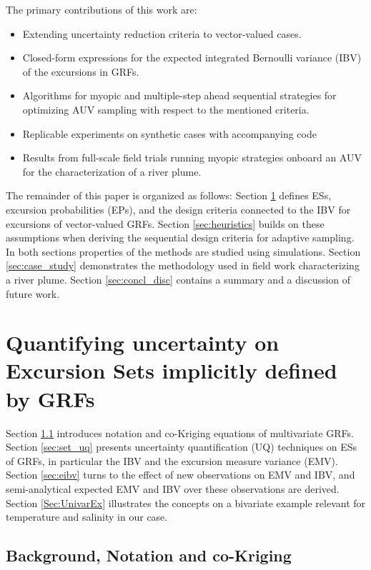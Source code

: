 \documentclass[aoas,preprint]{imsart}
\begin{document}
The primary contributions of this work are:

\begin{itemize}
\item Extending uncertainty reduction criteria to
  vector-valued cases.  
\item Closed-form expressions for the expected integrated Bernoulli
  variance (IBV) of the excursions in GRFs. 
\item Algorithms for myopic and multiple-step ahead sequential
  strategies for optimizing AUV sampling with respect to the mentioned
  criteria. 
\item Replicable experiments on synthetic cases with accompanying
  code
\item Results from full-scale field trials running myopic strategies onboard an AUV for the characterization of a river plume. 
\end{itemize}

The remainder of this paper is organized as follows:
Section \ref{sec:ESEP} defines ESs, excursion probabilities (EPs), and
the design criteria connected to the IBV for excursions of
vector-valued GRFs. Section \ref{sec:heuristics} builds on these
assumptions when deriving the sequential design criteria for adaptive
sampling. In both sections properties of the methods are studied using
simulations. Section \ref{sec:case_study} demonstrates the methodology
used in field work characterizing a river plume. Section
\ref{sec:concl_disc} contains a summary and a discussion of future
work.


\section{Quantifying uncertainty on Excursion Sets implicitly defined by GRFs}
\label{sec:ESEP}

Section \ref{sec:bg_and_notation} introduces notation and co-Kriging
equations of multivariate GRFs.  Section \ref{sec:set_uq} presents
uncertainty quantification (UQ) techniques on ESs of GRFs, in
particular the IBV and the excursion measure variance (EMV).  Section
\ref{sec:eibv} turns to the effect of new observations on EMV and IBV,
and semi-analytical expected EMV and IBV over these observations are
derived.
Section \ref{Sec:UnivarEx} illustrates the concepts on a bivariate
example relevant for temperature and salinity in our case.

\subsection{Background, Notation and co-Kriging}
\label{sec:bg_and_notation}
\end{document}
